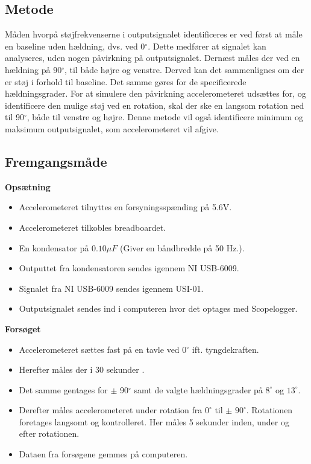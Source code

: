 \subsection{Metode}
Måden hvorpå støjfrekvenserne i outputsignalet identificeres er ved først at måle en baseline uden hældning, dvs. ved 0$^{\circ}$. Dette medfører at signalet kan analyseres, uden nogen påvirkning på outputsignalet. Dernæst måles der ved en hældning på 90$^{\circ}$, til både højre og venstre. Derved kan det sammenlignes om der er støj i forhold til baseline. Det samme gøres for de specificerede hældningsgrader. For at simulere den påvirkning accelerometeret udsættes for, og identificere den mulige støj ved en rotation, skal der ske en langsom rotation ned til 90$^{\circ}$, både til venstre og højre. Denne metode vil også identificere minimum og maksimum outputsignalet, som accelerometeret vil afgive.

\subsection{Fremgangsmåde}
\textbf{Opsætning}
\begin{itemize}
\item Accelerometeret tilnyttes en forsyningsspænding på 5.6V.
\item Accelerometeret tilkobles breadboardet.
\item En kondensator på $0.10 \mu F$ (Giver en båndbredde på 50 Hz.).
\item Outputtet fra kondensatoren sendes igennem NI USB-6009.
\item Signalet fra NI USB-6009 sendes igennem USI-01.
\item Outputsignalet sendes ind i computeren hvor det optages med Scopelogger.
\end{itemize}

\textbf{Forsøget}
\begin{itemize}
\item Accelerometeret sættes fast på en tavle ved 0$^{\circ}$ ift. tyngdekraften. 
\item Herefter måles der i 30 sekunder .
\item Det samme gentages for $\pm$ 90$^{\circ}$ samt de valgte hældningsgrader på $8^{\circ}$ og $13^{\circ}$.
\item Derefter måles accelerometeret under rotation fra $0^{\circ}$ til $\pm$ $90^{\circ}$. Rotationen foretages langsomt og kontrolleret. Her måles 5 sekunder inden, under og efter rotationen.
\item Dataen fra forsøgene gemmes på computeren.
\end{itemize}









